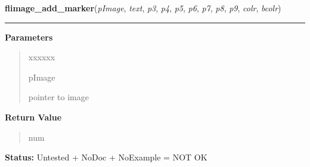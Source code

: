 \hspace{.8\funcindent}\begin{boxedminipage}{\funcwidth}

    \raggedright \textbf{flimage\_add\_marker}(\textit{pImage}, \textit{text}, \textit{p3}, \textit{p4}, \textit{p5}, \textit{p6}, \textit{p7}, \textit{p8}, \textit{p9}, \textit{colr}, \textit{bcolr})

    \vspace{-1.5ex}

    \rule{\textwidth}{0.5\fboxrule}
\setlength{\parskip}{2ex}
\setlength{\parskip}{1ex}
      \textbf{Parameters}
      \vspace{-1ex}

      \begin{quote}
        \begin{Ventry}{xxxxxx}

          \item[pImage]

          pointer to image

        \end{Ventry}

      \end{quote}

      \textbf{Return Value}
    \vspace{-1ex}

      \begin{quote}
      num

      \end{quote}

\textbf{Status:} Untested + NoDoc + NoExample = NOT OK



    \end{boxedminipage}

    \label{xformslib:library:flimage_add_marker_struct}

    \vspace{0.5ex}

